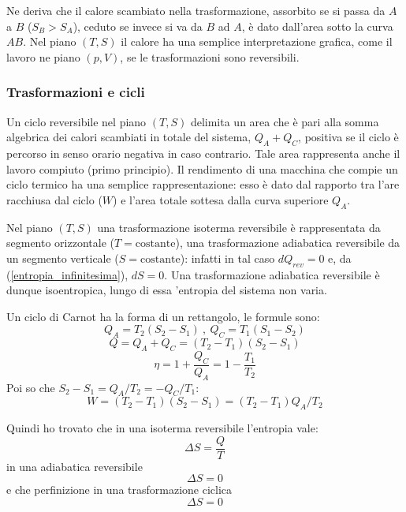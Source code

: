 \documentclass[class=book, crop=false, oneside, 12pt]{standalone}
\begin{document}
Ne deriva che il calore scambiato nella trasformazione, assorbito se si passa da \(A\) a \(B\) (\(S_B > S_A\)), ceduto se invece si va da \(B\) ad \(A\), è dato dall'area sotto la curva \(A B\). 
Nel piano \(\left(T, S\right)\) il calore ha una semplice interpretazione grafica, come il lavoro ne piano \(\left(p, V\right)\), se le trasformazioni sono reversibili.

\subsubsection*{Trasformazioni e cicli}

Un ciclo reversibile nel piano \(\left(T, S\right)\) delimita un area che è pari alla somma algebrica dei calori scambiati in totale del sistema, \(Q_A + Q_C\), positiva se il ciclo è percorso in senso orario negativa in caso contrario.
Tale area rappresenta anche il lavoro compiuto (primo principio).
Il rendimento di una macchina che compie un ciclo termico ha una semplice rappresentazione: esso è dato dal rapporto tra l'are racchiusa dal ciclo (\(W\)) e l'area totale sottesa dalla curva superiore \(Q_A\). 

Nel piano \(\left(T, S\right)\) una trasformazione isoterma reversibile è rappresentata da segmento orizzontale (\(T = \text{costante}\)), una trasformazione adiabatica reversibile da un segmento verticale (\(S = \text{costante}\)): infatti in tal caso \(d Q_{rev} = 0\) e, da (\ref{entropia_infinitesima}), \(d S = 0\).
Una trasformazione adiabatica reversibile è dunque isoentropica, lungo di essa 'entropia del sistema non varia.

Un ciclo di Carnot ha la forma di un rettangolo, le formule sono:
\begin{equation*}
    Q_A = T_2 \left(S_2 - S_1\right) \ , \ Q_C = T_1 \left(S_1 - S_2\right)
\end{equation*}
\begin{equation*}
    Q = Q_A + Q_C = \left(T_2 - T_1 \right) \left(S_2 - S_1\right)
\end{equation*}
\begin{equation*}
    \eta = 1 + \frac{Q_C}{Q_A} = 1- \frac{T_1}{T_2}
\end{equation*}
Poi so che \(S_2 - S_1 = Q_A / T_2 = -Q_C / T_1\):
\begin{equation*}
    W = \left(T_2 - T_1\right) \left(S_2 - S_1\right) = \left(T_2 - T_1 \right) Q_A / T_2
\end{equation*}

Quindi ho trovato che in una isoterma reversibile l'entropia vale:
\begin{equation}
    \Delta S = \frac{Q}{T}
\end{equation}
in una adiabatica reversibile
\begin{equation}
    \Delta S = 0
\end{equation}
e che perfinizione in una trasformazione ciclica
\begin{equation} \label{entropia_trasformazione_ciclica}
    \Delta S = 0
\end{equation}
\end{document}
